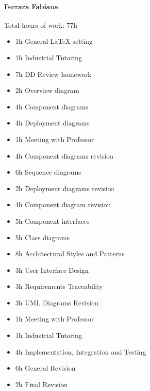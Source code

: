 \documentclass{report}
\begin{document}
		\paragraph{Ferrara Fabiana} Total hours of work: 77h
			\begin{itemize}
				\item 1h General LaTeX setting
				\item 1h Industrial Tutoring
				\item 7h DD Review homework
				\item 2h Overview diagram
				\item 4h Component diagrams
				\item 4h Deployment diagrams
				\item 1h Meeting with Professor
				\item 4h Component diagrams revision
				\item 6h Sequence diagrams
				\item 2h Deployment diagrams revision
				\item 4h Component diagram revision
				\item 5h Component interfaces
				\item 5h Class diagrams
				\item 8h Architectural Styles and Patterns
				\item 3h User Interface Design
				\item 3h Requirements Traceability
				\item 3h UML Diagrams Revision
				\item 1h Meeting with Professor
				\item 1h Industrial Tutoring
				\item 4h Implementation, Integration and Testing
				\item 6h General Revision
				\item 2h Final Revision
				
			\end{itemize}
\end{document}

